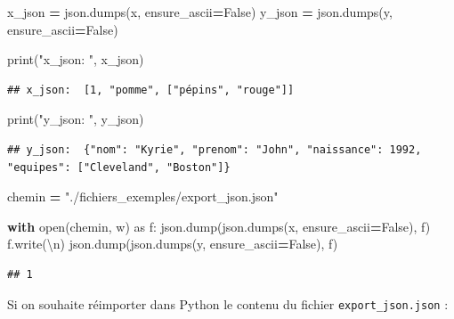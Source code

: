 \documentclass[
  12pt,
]{book}
\newenvironment{Shaded}{\begin{snugshade}}{\end{snugshade}}
\newcommand{\BuiltInTok}[1]{#1}
\newcommand{\CharTok}[1]{\textcolor[rgb]{0.31,0.60,0.02}{#1}}
\newcommand{\ControlFlowTok}[1]{\textcolor[rgb]{0.13,0.29,0.53}{\textbf{#1}}}
\newcommand{\ImportTok}[1]{#1}
\newcommand{\NormalTok}[1]{#1}
\newcommand{\OperatorTok}[1]{\textcolor[rgb]{0.81,0.36,0.00}{\textbf{#1}}}
\newcommand{\StringTok}[1]{\textcolor[rgb]{0.31,0.60,0.02}{#1}}
\newcommand{\VariableTok}[1]{\textcolor[rgb]{0.00,0.00,0.00}{#1}}
\numberwithin{equation}{section}
\numberwithin{countremarque}{section}
\begin{document}
\begin{Shaded}
\begin{Highlighting}[]
\NormalTok{x\_json }\OperatorTok{=}\NormalTok{ json.dumps(x, ensure\_ascii}\OperatorTok{=}\VariableTok{False}\NormalTok{)}
\NormalTok{y\_json }\OperatorTok{=}\NormalTok{ json.dumps(y, ensure\_ascii}\OperatorTok{=}\VariableTok{False}\NormalTok{)}

\BuiltInTok{print}\NormalTok{(}\StringTok{"x\_json: "}\NormalTok{, x\_json)}
\end{Highlighting}
\end{Shaded}

\begin{lstlisting}
## x_json:  [1, "pomme", ["pépins", "rouge"]]
\end{lstlisting}

\begin{Shaded}
\begin{Highlighting}[]
\BuiltInTok{print}\NormalTok{(}\StringTok{"y\_json: "}\NormalTok{, y\_json)}
\end{Highlighting}
\end{Shaded}

\begin{lstlisting}
## y_json:  {"nom": "Kyrie", "prenom": "John", "naissance": 1992, "equipes": ["Cleveland", "Boston"]}
\end{lstlisting}

\begin{Shaded}
\begin{Highlighting}[]
\NormalTok{chemin }\OperatorTok{=} \StringTok{"./fichiers\_exemples/export\_json.json"}

\ControlFlowTok{with} \BuiltInTok{open}\NormalTok{(chemin, }\StringTok{\textquotesingle{}w\textquotesingle{}}\NormalTok{) }\ImportTok{as}\NormalTok{ f:}
\NormalTok{    json.dump(json.dumps(x, ensure\_ascii}\OperatorTok{=}\VariableTok{False}\NormalTok{), f)}
\NormalTok{    f.write(}\StringTok{\textquotesingle{}}\CharTok{\textbackslash{}n}\StringTok{\textquotesingle{}}\NormalTok{)}
\NormalTok{    json.dump(json.dumps(y, ensure\_ascii}\OperatorTok{=}\VariableTok{False}\NormalTok{), f)}
\end{Highlighting}
\end{Shaded}

\begin{lstlisting}
## 1
\end{lstlisting}

Si on souhaite réimporter dans Python le contenu du fichier \texttt{export\_json.json} :
\end{document}

